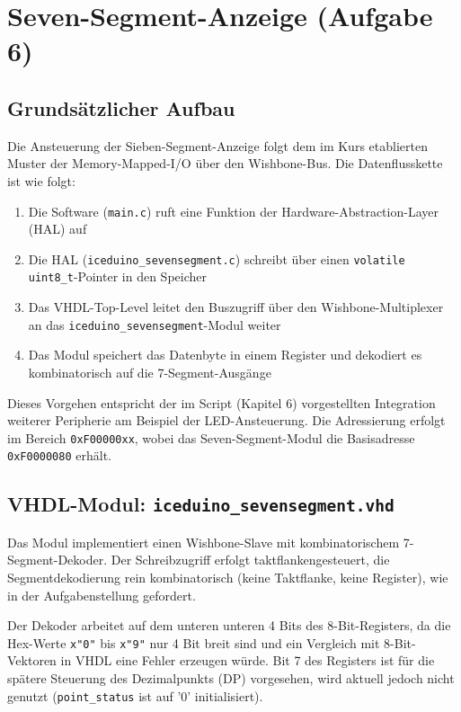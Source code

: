 \newpage
\section{Seven-Segment-Anzeige (Aufgabe 6)}

\subsection{Grundsätzlicher Aufbau}

Die Ansteuerung der Sieben-Segment-Anzeige folgt dem im Kurs etablierten Muster der Memory-Mapped-I/O über den Wishbone-Bus. Die Datenflusskette ist wie folgt:

\begin{enumerate}
    \item Die Software (\texttt{main.c}) ruft eine Funktion der Hardware-Abstraction-Layer (HAL) auf
    \item Die HAL (\texttt{iceduino\_sevensegment.c}) schreibt über einen \texttt{volatile uint8\_t}-Pointer in den Speicher
    \item Das VHDL-Top-Level leitet den Buszugriff über den Wishbone-Multiplexer an das \texttt{iceduino\_sevensegment}-Modul weiter
    \item Das Modul speichert das Datenbyte in einem Register und dekodiert es kombinatorisch auf die 7-Segment-Ausgänge
\end{enumerate}

Dieses Vorgehen entspricht der im Script (Kapitel 6) vorgestellten Integration weiterer Peripherie am Beispiel der LED-Ansteuerung. Die Adressierung erfolgt im Bereich \texttt{0xF00000xx}, wobei das Seven-Segment-Modul die Basisadresse \texttt{0xF0000080} erhält.

\subsection{VHDL-Modul: \texttt{iceduino\_sevensegment.vhd}}


Das Modul implementiert einen Wishbone-Slave mit kombinatorischem 7-Segment-Dekoder. Der Schreibzugriff erfolgt taktflankengesteuert, die Segmentdekodierung rein kombinatorisch (keine Taktflanke, keine Register), wie in der Aufgabenstellung gefordert.

Der Dekoder arbeitet auf dem unteren unteren 4 Bits des 8-Bit-Registers, da die Hex-Werte \texttt{x"0"} bis \texttt{x"9"} nur 4 Bit breit sind und ein Vergleich mit 8-Bit-Vektoren in VHDL eine Fehler erzeugen würde. Bit 7 des Registers ist für die spätere Steuerung des Dezimalpunkts (DP) vorgesehen, wird aktuell jedoch nicht genutzt (\texttt{point\_status} ist auf '0' initialisiert).

